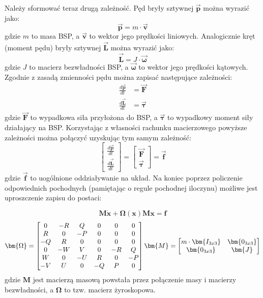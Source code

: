 Należy sformować teraz drugą zależność. Pęd bryły sztywnej $\bm{\vec{p}}$ można wyrazić jako:
\[
	\bm{\vec{p}} = m \cdot \bm{\vec{v}}
\]
gdzie $m$ to masa BSP, a $\bm{\vec{v}}$ to wektor jego prędkości liniowych.
Analogicznie kręt (moment pędu) bryły sztywnej $\bm{\vec{L}}$ można wyrazić jako:
\[
	\bm{\vec{L}} = J \cdot \bm{\vec{\omega}}
\]
gdzie $J$ to macierz bezwładności BSP, a $\bm{\vec{\omega}}$ to wektor jego prędkości kątowych. Zgodnie z zasadą zmienności pędu można zapisać następujące zależności:
\[
	\begin{aligned}
	\frac{d\bm{\vec{p}}}{dt} & = \bm{\vec{F}}\\
	\frac{d\bm{\vec{L}}}{dt} & = \bm{\vec{\tau}}
	\end{aligned}
\]
gdzie $\bm{\vec{F}}$ to wypadkowa siła przyłożona do BSP, a $\bm{\vec{\tau}}$ to wypadkowy moment siły działający na BSP. Korzystając z własności rachunku macierzowego powyższe zależności można połączyć uzyskując tym samym zależność:
\[
              \begin{bmatrix}\frac{d\bm{\vec{p}}}{dt}\\ \frac{d\bm{\vec{L}}}{dt} \end{bmatrix} = \begin{bmatrix}\bm{\vec{F}}\\ \bm{\vec{\tau}} \end{bmatrix} = \bm{\vec{f}}
\]
gdzie $\bm{\vec{f}}$ to uogólnione oddziaływanie na układ. Na koniec poprzez policzenie odpowiednich pochodnych (pamiętając o regule pochodnej iloczynu) możliwe jest uproszczenie zapisu do postaci:

\[
	\bm{M} \bm{\dot{x}} +  \bm{\Omega} \left( \bm{x} \right) \bm{M} \bm{x} = \bm{f}
\]
\[
	\bm{\Omega} = \begin{bmatrix}
	0 & -R & Q & 0 & 0 & 0 \\
	R & 0 & -P & 0 & 0 & 0 \\
	-Q & R & 0 & 0 & 0 & 0 \\
	0 & -W & V & 0 & -R & Q \\
	W & 0 & -U & R & 0 & -P \\
	-V & U & 0 & -Q & P & 0 
	\end{bmatrix}
	\vspace{10pt}
	\bm{M} = \begin{bmatrix}
	m\cdot \bm{ I_{3x3}} & \bm{0_{3x3}} \\ \bm{0_{3x3}} & \bm{J}
	\end{bmatrix}
\]
gdzie $\bm{M}$ jest macierzą masową powstała przez połączenie masy i macierzy bezwładności, a $\bm{\Omega}$ to tzw. macierz żyroskopowa.\\

